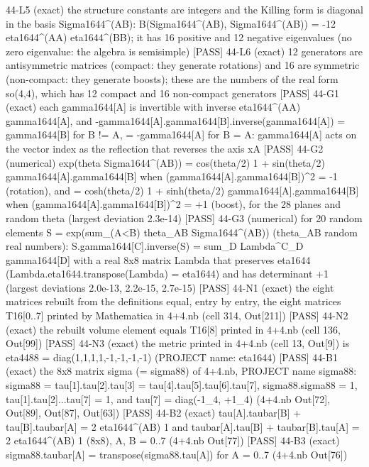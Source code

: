 \documentclass[
  10pt,
]{article}
\newenvironment{Shaded}{}{}
\newcommand{\NormalTok}[1]{#1}
\begin{document}
\begin{Shaded}
\begin{Highlighting}[]
\NormalTok{[PASS] 44{-}L5  (exact) the structure constants are integers and the Killing form is diagonal in the basis Sigma1644\^{}(AB): B(Sigma1644\^{}(AB), Sigma1644\^{}(AB)) = {-}12 eta1644\^{}(AA) eta1644\^{}(BB); it has 16 positive and 12 negative eigenvalues (no zero eigenvalue: the algebra is semisimple)}
\NormalTok{[PASS] 44{-}L6  (exact) 12 generators are antisymmetric matrices (compact: they generate rotations) and 16 are symmetric (non{-}compact: they generate boosts); these are the numbers of the real form so(4,4), which has 12 compact and 16 non{-}compact generators}
\NormalTok{[PASS] 44{-}G1  (exact) each gamma1644[A] is invertible with inverse eta1644\^{}(AA) gamma1644[A], and {-}gamma1644[A].gamma1644[B].inverse(gamma1644[A]) = gamma1644[B] for B != A, = {-}gamma1644[A] for B = A: gamma1644[A] acts on the vector index as the reflection that reverses the axis xA}
\NormalTok{[PASS] 44{-}G2  (numerical) exp(theta Sigma1644\^{}(AB)) = cos(theta/2) 1 + sin(theta/2) gamma1644[A].gamma1644[B] when (gamma1644[A].gamma1644[B])\^{}2 = {-}1 (rotation), and = cosh(theta/2) 1 + sinh(theta/2) gamma1644[A].gamma1644[B] when (gamma1644[A].gamma1644[B])\^{}2 = +1 (boost), for the 28 planes and random theta (largest deviation 2.3e{-}14)}
\NormalTok{[PASS] 44{-}G3  (numerical) for 20 random elements S = exp(sum\_(A\textless{}B) theta\_AB Sigma1644\^{}(AB)) (theta\_AB random real numbers):  S.gamma1644[C].inverse(S) = sum\_D Lambda\^{}C\_D gamma1644[D] with a real 8x8 matrix Lambda that preserves eta1644 (Lambda.eta1644.transpose(Lambda) = eta1644) and has determinant +1 (largest deviations 2.0e{-}13, 2.2e{-}15, 2.7e{-}15)}
\NormalTok{[PASS] 44{-}N1  (exact) the eight matrices rebuilt from the definitions equal, entry by entry, the eight matrices T16[0..7] printed by Mathematica in 4+4.nb (cell 314, Out[211])}
\NormalTok{[PASS] 44{-}N2  (exact) the rebuilt volume element equals T16[8] printed in 4+4.nb (cell 136, Out[99])}
\NormalTok{[PASS] 44{-}N3  (exact) the metric printed in 4+4.nb (cell 13, Out[9]) is eta4488 = diag(1,1,1,1,{-}1,{-}1,{-}1,{-}1) (PROJECT name: eta1644)}
\NormalTok{[PASS] 44{-}B1  (exact) the 8x8 matrix sigma (= sigma88) of 4+4.nb, PROJECT name sigma88: sigma88 = tau[1].tau[2].tau[3] = tau[4].tau[5].tau[6].tau[7], sigma88.sigma88 = 1, tau[1].tau[2]...tau[7] = 1, and tau[7] = diag({-}1\_4, +1\_4) (4+4.nb Out[72], Out[89], Out[87], Out[63])}
\NormalTok{[PASS] 44{-}B2  (exact) tau[A].taubar[B] + tau[B].taubar[A] = 2 eta1644\^{}(AB) 1 and taubar[A].tau[B] + taubar[B].tau[A] = 2 eta1644\^{}(AB) 1 (8x8), A, B = 0..7 (4+4.nb Out[77])}
\NormalTok{[PASS] 44{-}B3  (exact) sigma88.taubar[A] = transpose(sigma88.tau[A]) for A = 0..7 (4+4.nb Out[76])}

\end{Highlighting}
\end{Shaded}
\end{document}
